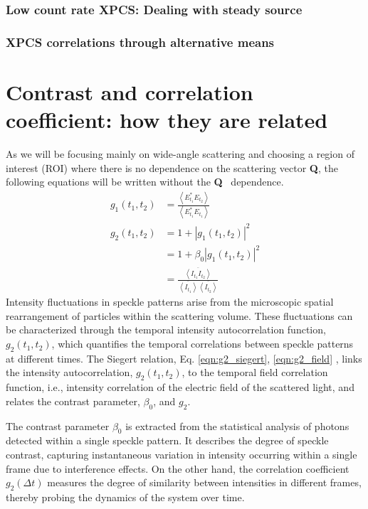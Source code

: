 \documentclass[11pt]{article}
\theoremstyle{definition}
\newcommand{\QQ}{\textbf{Q}}
\begin{document}
\subsubsection{Low count rate XPCS: Dealing with steady source}

\subsubsection{XPCS correlations through alternative means}
\section{Contrast and correlation coefficient: how they are related}
As we will be focusing mainly on wide-angle scattering and choosing a region of interest (ROI) where there is no dependence on the scattering vector \QQ, the following equations will be written without the \QQ~ dependence. 
\begin{align}
g_1(t_1, t_2) &= \frac{\left< E^*_{t_1} E_{t_2} \right>}{\left< E^*_{t_1} E_{t_1} \right>} \\
g_2(t_1, t_2) &= 1 + |g_1(t_1, t_2)|^2 \label{eqn:g2_field} \\
&= 1 + \beta_0 |g_1(t_1, t_2)|^2 \label{eqn:g2_siegert}\\
&= \frac{\overline{\left< I_{t_1} I_{t_2} \right>}}{\overline{\left< I_{t_1} \right>} \overline{\left< I_{t_2} \right>}} \label{eqn:g2_intensity} 
\end{align}
Intensity fluctuations in speckle patterns arise from the microscopic spatial rearrangement of particles within the scattering volume. These fluctuations can be characterized through the temporal intensity autocorrelation function, \( g_2(t_1, t_2) \), which quantifies the temporal correlations between speckle patterns at different times. The Siegert relation, Eq. \eqref{eqn:g2_siegert}, \eqref{eqn:g2_field} \cite{ferreira2020, jo_single_2023}, links the intensity autocorrelation, \( g_2(t_1, t_2) \), to the temporal field correlation function, i.e., intensity correlation of the electric field of the scattered light, and relates the contrast parameter, \(\beta_0\), and \( g_2 \). 

The contrast parameter \(\beta_0\) is extracted from the statistical analysis of photons detected within a single speckle pattern. It describes the degree of speckle contrast, capturing instantaneous variation in intensity occurring within a single frame due to interference effects. On the other hand, the correlation coefficient \( g_2(\Delta t) \) measures the degree of similarity between intensities in different frames, thereby probing the dynamics of the system over time.
\end{document}
